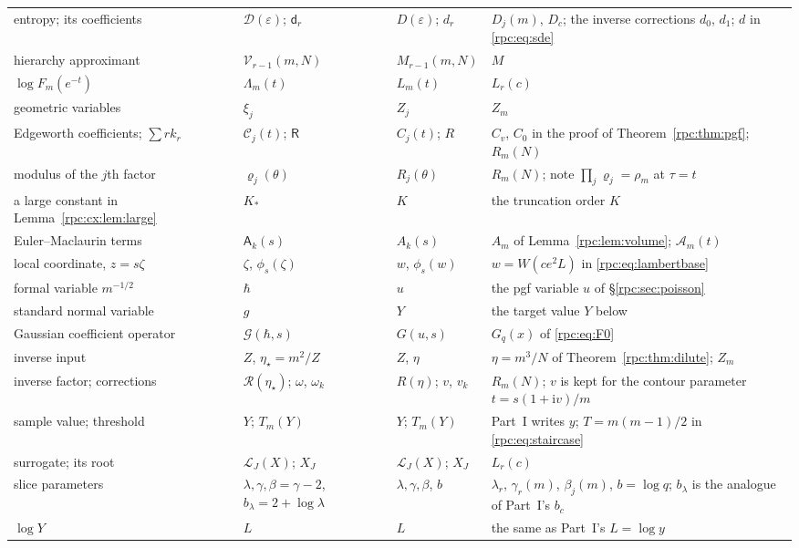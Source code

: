 \documentclass[11pt]{article}
\theoremstyle{definition}
\theoremstyle{remark}
\newcommand{\ii}{\mathrm i}
\numberwithin{equation}{section}
\begin{document}
\begin{longtable}{@{}>{\raggedright\arraybackslash}p{}>{\raggedright\arraybackslash}p{}>{\raggedright\arraybackslash}p{}>{\raggedright\arraybackslash}p{}@{}}
entropy; its coefficients & $\mathcal D(\varepsilon)$; $\mathsf d_r$ & $D(\varepsilon)$; $d_r$ & $D_j(m)$, $D_c$; the inverse corrections $d_0$, $d_1$; $d$ in \eqref{rpc:eq:sde}\\
hierarchy approximant & $\mathcal V_{r-1}(m,N)$ & $M_{r-1}(m,N)$ & $M$\\
$\log F_m(e^{-t})$ & $\Lambda_m(t)$ & $L_m(t)$ & $L_r(c)$\\
geometric variables & $\xi_j$ & $Z_j$ & $Z_m$\\
Edgeworth coefficients; $\sum rk_r$ & $\mathcal C_j(t)$; $\mathsf R$ & $C_j(t)$; $R$ & $C_v$, $C_0$ in the proof of Theorem~\ref{rpc:thm:pgf}; $R_m(N)$\\
modulus of the $j$th factor & $\varrho_j(\theta)$ & $R_j(\theta)$ & $R_m(N)$; note $\prod_j\varrho_j=\rho_m$ at $\tau=t$\\
a large constant in Lemma~\ref{rpc:cx:lem:large} & $K_\ast$ & $K$ & the truncation order $K$\\
Euler--Maclaurin terms & $\mathsf A_k(s)$ & $A_k(s)$ & $A_m$ of Lemma~\ref{rpc:lem:volume}; $\mathcal A_m(t)$\\
local coordinate, $z=s\zeta$ & $\zeta$, $\phi_s(\zeta)$ & $w$, $\phi_s(w)$ & $w=W(ce^2L)$ in \eqref{rpc:eq:lambertbase}\\
formal variable $m^{-1/2}$ & $\hbar$ & $u$ & the pgf variable $u$ of \S\ref{rpc:sec:poisson}\\
standard normal variable & $g$ & $Y$ & the target value $Y$ below\\
Gaussian coefficient operator & $\mathcal G(\hbar,s)$ & $G(u,s)$ & $G_q(x)$ of \eqref{rpc:eq:F0}\\
inverse input & $Z$, $\eta_\star=m^2/Z$ & $Z$, $\eta$ & $\eta=m^3/N$ of Theorem~\ref{rpc:thm:dilute}; $Z_m$\\
inverse factor; corrections & $\mathcal R(\eta_\star)$; $\omega$, $\omega_k$ & $R(\eta)$; $v$, $v_k$ & $R_m(N)$; $v$ is kept for the contour parameter $t=s(1+\ii v)/m$\\
sample value; threshold & $Y$; $T_m(Y)$ & $Y$; $T_m(Y)$ & Part~I writes $y$; $T=m(m-1)/2$ in \eqref{rpc:eq:staircase}\\
surrogate; its root & $\mathcal L_J(X)$; $X_J$ & $\mathcal L_J(X)$; $X_J$ & $L_r(c)$\\
slice parameters & $\lambda,\gamma,\beta=\gamma-2$, $b_\lambda=2+\log\lambda$ & $\lambda,\gamma,\beta$, $b$ & $\lambda_r$, $\gamma_r(m)$, $\beta_j(m)$, $b=\log q$; $b_\lambda$ is the analogue of Part~I's $b_c$\\
$\log Y$ & $L$ & $L$ & the same as Part~I's $L=\log y$\\
\end{longtable}
\endgroup
\end{document}
